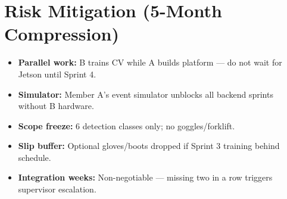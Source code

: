 \documentclass[12pt,a4paper]{article}
\begin{document}
\section{Risk Mitigation (5-Month Compression)}

\begin{itemize}
    \item \textbf{Parallel work:} B trains CV while A builds platform --- do not wait for Jetson until Sprint 4.
    \item \textbf{Simulator:} Member A's event simulator unblocks all backend sprints without B hardware.
    \item \textbf{Scope freeze:} 6 detection classes only; no goggles/forklift.
    \item \textbf{Slip buffer:} Optional gloves/boots dropped if Sprint 3 training behind schedule.
    \item \textbf{Integration weeks:} Non-negotiable --- missing two in a row triggers supervisor escalation.
\end{itemize}
\end{document}
